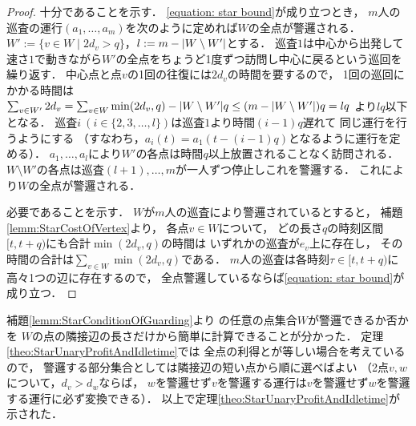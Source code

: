 \begin{proof}
  十分であることを示す．
  \eqref{equation: star bound}が成り立つとき，
  $m$人の巡査の運行$(a_1, \ldots, a_m)$を次のように定めれば$W$の全点が警邏される．
  $W' := \{ v \in W \mid 2d_v > q \}$，$l := m - \lvert{W \setminus W'}\rvert$とする．
  巡査$1$は中心から出発して速さ$1$で動きながら$W'$の全点をちょうど1度ずつ訪問し中心に戻るという巡回を繰り返す．
  中心点と点$v$の1回の往復には$2d_v$の時間を要するので，
  1回の巡回にかかる時間は
  $\sum_{v \in W'} 2d_v
    = \sum_{v \in W} \min(2d_v, q) - \lvert{W \setminus W'}\rvert q
    \leq (m - \lvert{W \setminus W'}\rvert)q = lq$%
  より$lq$以下となる．
  巡査$i\ (i \in \{ 2, 3, \ldots, l \})$は巡査$1$より時間$(i - 1)q$遅れて
  同じ運行を行うようにする
  （すなわち，$a_i(t) = a_1(t - (i - 1)q)$となるように運行を定める）．
  $a_1, \ldots, a_l$により$W'$の各点は時間$q$以上放置されることなく訪問される．
  $W \setminus W'$の各点は巡査$(l + 1), \ldots, m$が一人ずつ停止しこれを警邏する．
  これにより$W$の全点が警邏される．

  必要であることを示す．
  $W$が$m$人の巡査により警邏されているとすると，
  補題\ref{lemm:StarCostOfVertex}より，
  各点$v \in W$について，
  どの長さ$q$の時刻区間$[t, t + q)$にも合計$\min(2d_v, q)$の時間は
  いずれかの巡査が$e_v$上に存在し，
  その時間の合計は$\sum_{v \in W} \min(2d_v, q)$である．
  $m$人の巡査は各時刻$\tau \in [t, t + q)$に高々1つの辺に存在するので，
  全点警邏しているならば\eqref{equation: star bound}が成り立つ．
\end{proof}


補題\ref{lemm:StarConditionOfGuarding}より
{\graphStar}の任意の点集合$W$が警邏できるか否かを
$W$の点の隣接辺の長さだけから簡単に計算できることが分かった．
定理\ref{theo:StarUnaryProfitAndIdletime}では
全点の利得と{\maxIdletime}が等しい場合を考えているので，
警邏する部分集合としては隣接辺の短い点から順に選べばよい
（2点$v, w$について，$d_v > d_w$ならば，
$w$を警邏せず$v$を警邏する運行は$v$を警邏せず$w$を警邏する運行に必ず変換できる）．
以上で定理\ref{theo:StarUnaryProfitAndIdletime}が示された．
